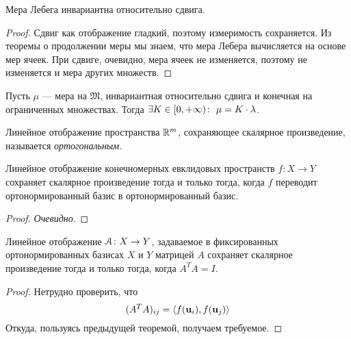\begin{corollary}
	Мера Лебега инвариантна относительно сдвига.
\end{corollary}
\begin{proof}
	Сдвиг как отображение гладкий, поэтому измеримость сохраняется. Из теоремы
	о продолжении меры мы знаем, что мера Лебера вычисляется на основе мер
	ячеек. При сдвиге, очевидно, мера ячеек не изменяется, поэтому не изменяется и мера 
	других множеств.
\end{proof}

\begin{theorem}
	Пусть $\mu$ --- мера на $\mathfrak{M}$, инвариантная относительно сдвига и конечная на 
	ограниченных множествах. Тогда $\exists K \in [0, +\infty)\colon~ \mu = K \cdot \lambda$.
\end{theorem}

\begin{definition}
	Линейное отображение пространства $\mathbb{R}^m$, сохраняющее скалярное произведение, 
	называется \textit{ортогональным}.
\end{definition}

\begin{theorem}
	Линейное отображение конечномерных евклидовых пространств $f \colon X \to Y$ 
	сохраняет скалярное произведение тогда и только тогда, когда $f$ переводит 
	ортонормированный базис в ортонормированный базис.
\end{theorem}
\begin{proof}
	\textit{Очевидно}.
\end{proof}

\begin{theorem}
	Линейное отображение $\mathcal{A} \colon X \to Y$, задаваемое в фиксированных ортонормированных 
	базисах $X$ и $Y$ матрицей $A$ сохраняет скалярное произведение тогда и только тогда,
	когда $A^T A = I$.
\end{theorem}
\begin{proof}
	Нетрудно проверить, что
\[
	(A^T A)_{ij} = \langle f(\mathbf{u}_i), f(\mathbf{u}_j)\rangle
\]
	Откуда, пользуясь предыдущей теоремой, получаем требуемое.	
\end{proof}

